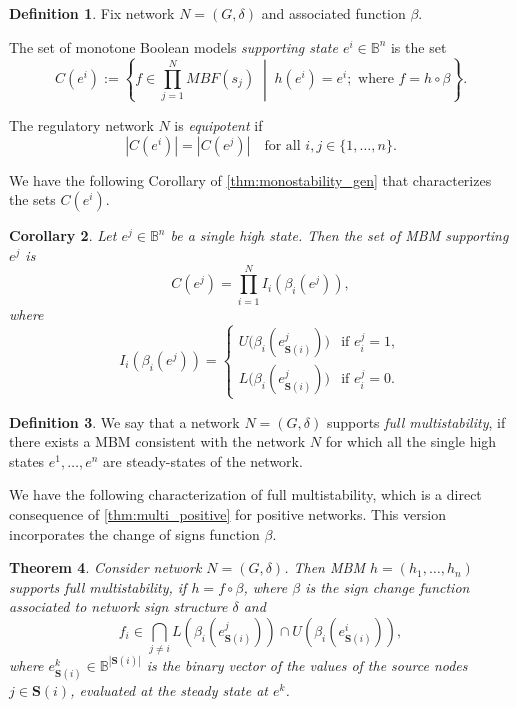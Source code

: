 \documentclass[12pt]{amsart}
\newcommand{\bbB}{\mathbb{B}}
\newcommand{\Sources}{\mathbf{S}}
\newtheorem{thm}{Theorem}[section]
\newtheorem{cor}[thm]{Corollary}
\theoremstyle{definition}
\newtheorem{defn}[thm]{Definition}
\begin{document}
\begin{defn}\label{Equipotency}
Fix network $N=(G,\delta)$ and associated function $\beta$.

The set of monotone Boolean models 
\textit{ supporting state $e^i \in \mathbb{B}^n$} is the set 
\[
C(e^i)
:=
\left\{ f \in \prod_{j=1}^N {MBF(s_j)}
\;\middle|\;
h(e^i) = e^i; \mbox{ where } f=h \circ \beta
\right\}.
\]

The regulatory network $N$ is \textit{equipotent} if
\[
|C(e^i)| = |C(e^j)|
\quad
\text{for all } i,j \in \{1,\dots,n\}.
\]
\end{defn}

We have the following Corollary of \cref{thm:monostability_gen} that characterizes the sets $C(e^i)$.

\begin{cor}\label{decomp}
Let $e^j \in \mathbb{B}^n$ be a single high state. Then the set of MBM supporting $e^j$ is
\[
C(e^j)
=
\prod_{i=1}^N
I_i(\beta_i(e^j)),
\]
where 
\[
I_i(\beta_i(e^j))
=
\begin{cases}
U \big(\beta_i(e^j_{\Sources(i)})\big) & \text{if } e^j_i = 1, \\[6pt]
L \big(\beta_i(e^j_{\Sources(i)})\big) & \text{if } e^j_i = 0.
\end{cases}
\]
\end{cor}

\begin{defn}
We say that a network $N=(G, \delta)$ supports \textit{ full multistability},
if there exists a MBM consistent with the network $N$ for which all the single high states $e^1, \ldots, e^n$ are steady-states of the network. 
\end{defn}

We have the following characterization of full multistability, which is a direct consequence of \cref{thm:multi_positive} for positive networks. This version incorporates the change of signs function $\beta$.

\begin{thm}
\label{thm:multi_general} 
    \label{intersections}
    Consider network $N=(G, \delta)$. 
    Then MBM $h=(h_1, \ldots, h_n)$ supports full multistability, if $h=f\circ \beta$, where $\beta$ is the sign change function associated to network sign structure $\delta$ and
    \begin{equation} 
    f_i \in \bigcap_{j \not = i} L(\beta_i(e^j_{\Sources(i)})) \cap U(\beta_i(e^i_{\Sources(i)})),
    \end{equation}
    where $e^k_{\Sources(i)} \in \bbB^{|\Sources(i)|}$ is the binary vector of the values of the source nodes $j \in \Sources(i)$, evaluated at the steady state at $e^k$.
\end{thm}
\end{document}
